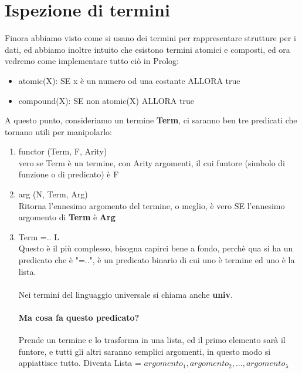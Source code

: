 \documentclass[12pt, a4paper, openany, oneside]{book}
\begin{document}
\section{Ispezione di termini}
Finora abbiamo visto come si usano dei termini per rappresentare strutture per i
dati, ed abbiamo inoltre intuito che esistono termini atomici e composti, ed 
ora vedremo come implementare tutto ciò in Prolog:
\begin{itemize}
	\item atomic(X): SE x è un numero od una costante ALLORA true
	\item compound(X): SE non atomic(X) ALLORA true
\end{itemize}
A questo punto, consideriamo un termine \textbf{Term}, ci saranno ben tre
predicati che tornano utili per manipolarlo:
\begin{enumerate}
	\item \color{red}functor \color{black} (Term, F, Arity)\\
	vero se Term è un termine, con Arity argomenti, il cui funtore (simbolo di 
	funzione o di predicato) è F
	\item \color{red}arg \color{black} (N, Term, Arg)\\
	Ritorna l'ennesimo argomento del termine, o meglio, è vero SE l'ennesimo 
	argomento di \textbf{Term} è \textbf{Arg}
	\item Term =.. L\\
	Questo è il più complesso, bisogna capirci bene a fondo, perchè qua si ha 
	un predicato che è "=..", è un predicato binario di cui uno è termine ed
	uno è la lista. \\ \\
	Nei termini del linguaggio universale si chiama anche \textbf{univ}. 
	\paragraph{Ma cosa fa questo predicato?} Prende un termine e lo trasforma
	in una lista, ed il primo elemento sarà il funtore, e tutti gli altri 
	saranno semplici argomenti, in questo modo si appiattisce tutto. Diventa 
	Lista = $argomento_{1}, argomento_{2}, ..., argomento_{\lambda}$
\end{enumerate}
\end{document}
